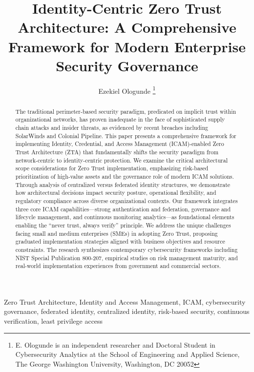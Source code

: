\documentclass[journal]{IEEEtran}
\begin{document}
\title{Identity-Centric Zero Trust Architecture: A Comprehensive Framework for Modern Enterprise Security Governance}

\author{Ezekiel Ologunde%
\thanks{E. Ologunde is an independent researcher and Doctoral Student in Cybersecurity Analytics at the School of Engineering and Applied Science, The George Washington University, Washington, DC 20052}}


\maketitle

\begin{abstract}
The traditional perimeter-based security paradigm, predicated on implicit trust within
organizational networks, has proven inadequate in the face of sophisticated supply chain
attacks and insider threats, as evidenced by recent breaches including SolarWinds and
Colonial Pipeline. This paper presents a comprehensive framework for implementing
Identity, Credential, and Access Management (ICAM)-enabled Zero Trust Architecture (ZTA)
that fundamentally shifts the security paradigm from network-centric to identity-centric
protection. We examine the critical architectural scope considerations for Zero Trust
implementation, emphasizing risk-based prioritization of high-value assets and the
governance role of modern ICAM solutions. Through analysis of centralized versus
federated identity structures, we demonstrate how architectural decisions impact security
posture, operational flexibility, and regulatory compliance across diverse organizational
contexts. Our framework integrates three core ICAM capabilities---strong authentication
and federation, governance and lifecycle management, and continuous monitoring
analytics---as foundational elements enabling the ``never trust, always verify''
principle. We address the unique challenges facing small and medium enterprises (SMEs)
in adopting Zero Trust, proposing graduated implementation strategies aligned with
business objectives and resource constraints. The research synthesizes contemporary
cybersecurity frameworks including NIST Special Publication 800-207, empirical studies
on risk management maturity, and real-world implementation experiences from government
and commercial sectors.
\end{abstract}

\begin{IEEEkeywords}
Zero Trust Architecture, Identity and Access Management, ICAM, cybersecurity governance,
federated identity, centralized identity, risk-based security, continuous verification,
least privilege access
\end{IEEEkeywords}
\end{document}
